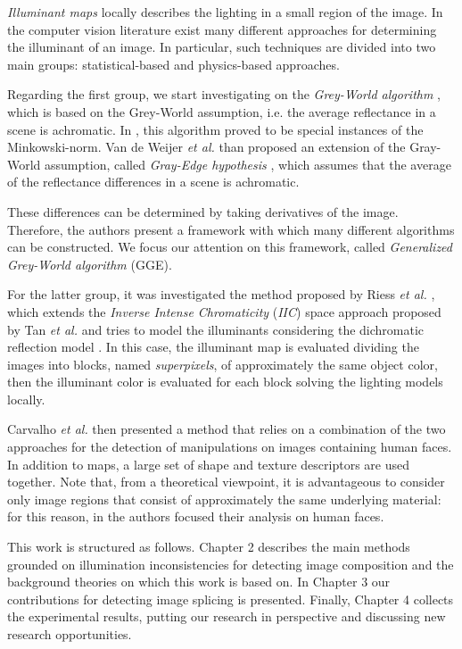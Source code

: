 \emph{Illuminant maps} locally describes the lighting in a small region of the image. In the computer vision literature exist many different approaches for determining the illuminant of an image. In particular, such techniques are divided into two main groups: statistical-based and physics-based approaches.

Regarding the first group, we start investigating on the \emph{Grey-World algorithm} \cite{Buchsbaum19801}, which is based on the Grey-World assumption, i.e. the average reflectance in a scene is achromatic. In \cite{finlayson2004shades}, this algorithm proved to be special instances of the Minkowski-norm. Van de Weijer \emph{et al.} \cite{van2007edge} than proposed an extension of the Gray-World assumption, called \emph{Gray-Edge hypothesis} \cite{van2007edge}, which assumes that the average of the reflectance differences in a scene is achromatic. 

These differences can be determined by taking derivatives of the image. Therefore, the authors present a framework with which many different algorithms can be constructed.
We focus our attention on this framework, called \emph{Generalized Grey-World algorithm} (GGE).

For the latter group, it was investigated the method proposed by Riess \emph{et al.} \cite{riess2010scene}, which extends the \emph{Inverse Intense Chromaticity} (\emph{IIC}) space approach proposed by Tan \emph{et al.} \cite{tan2004color} and tries to model the illuminants considering the dichromatic reflection model \cite{tominaga1989standard}. In this case, the illuminant map is evaluated dividing the images into blocks, named \emph{superpixels}, of approximately the same object color, then the illuminant color is evaluated for each block solving the lighting models locally. 

Carvalho \emph{et al.} \cite{carvalho2016illuminant} then presented a method that relies on a combination of the two approaches for the detection of manipulations on images containing human faces. In addition to maps, a large set of shape and texture descriptors are used together. Note that, from a theoretical viewpoint, it is advantageous to consider only image regions that consist of approximately the same underlying material: for this reason, in \cite{carvalho2016illuminant} the authors focused their analysis on human faces.

This work is structured as follows. Chapter 2 describes the main methods grounded on illumination inconsistencies for detecting image composition and the background theories on which this work is based on. In Chapter 3 our contributions for detecting image splicing is presented. Finally, Chapter 4 collects the experimental results, putting our research in perspective and discussing new research opportunities.